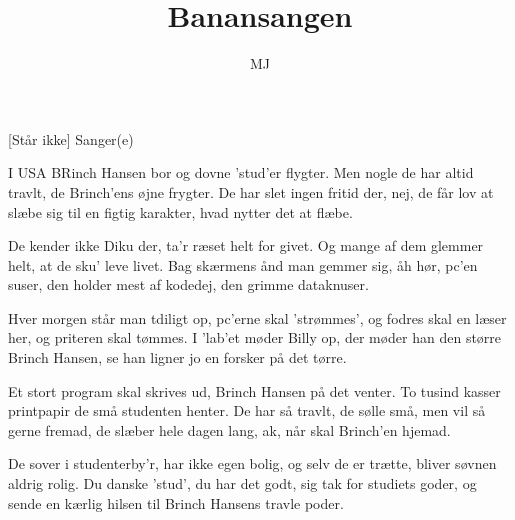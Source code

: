 \documentclass[a4paper,11pt]{article}
\title{Banansangen}
\author{MJ}
\begin{document}
\maketitle

\begin{roles}
[Står ikke] Sanger(e)
\end{roles}


\begin{song}
%
I USA BRinch Hansen bor
og dovne 'stud'er flygter.
Men nogle de har altid travlt,
de Brinch'ens øjne frygter.
De har slet ingen fritid der,
nej, de får lov at slæbe
sig til en figtig karakter,
hvad nytter det at flæbe.

De kender ikke Diku der,
ta'r ræset helt for givet.
Og mange af dem glemmer helt,
at de sku' leve livet.
Bag skærmens ånd man gemmer sig, åh hør, pc'en suser,
den holder mest af kodedej,
den grimme dataknuser.

Hver morgen står man tdiligt op,
pc'erne skal 'strømmes',
og fodres skal en læser her,
og priteren skal tømmes.
I 'lab'et møder Billy op,
der møder han den større
Brinch Hansen, se han ligner jo
en forsker på det tørre.

Et stort program skal skrives ud,
Brinch Hansen på det venter.
To tusind kasser printpapir
de små studenten henter.
De har så travlt, de sølle små,
men vil så gerne fremad,
de slæber hele dagen lang,
ak, når skal Brinch'en hjemad.

De sover i studenterby'r,
har ikke egen bolig,
og selv de er trætte, bliver søvnen aldrig rolig.
Du danske 'stud', du har det godt,
sig tak for studiets goder,
og sende en kærlig hilsen til
Brinch Hansens travle poder.
\end{song}
\end{document}
